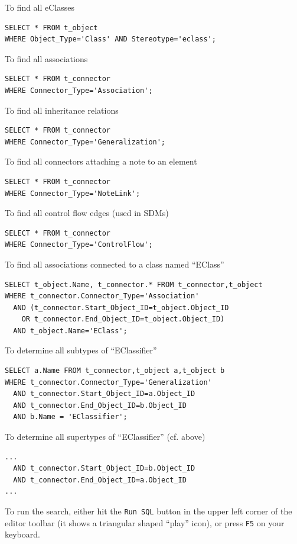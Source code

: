 \begin{stepbystep}

\item To find all eClasses
\begin{lstlisting}[linewidth=11cm]
SELECT * FROM t_object
WHERE Object_Type='Class' AND Stereotype='eclass';
\end{lstlisting}

\item To find all associations
\begin{lstlisting}[linewidth=11cm]
SELECT * FROM t_connector
WHERE Connector_Type='Association';
\end{lstlisting}

\item To find all inheritance relations
\begin{lstlisting}[linewidth=11cm]
SELECT * FROM t_connector
WHERE Connector_Type='Generalization';
\end{lstlisting}

\item To find all connectors attaching a note to an element
\begin{lstlisting}[linewidth=11cm]
SELECT * FROM t_connector
WHERE Connector_Type='NoteLink';
\end{lstlisting}

\item To find all control flow edges (used in SDMs)
\begin{lstlisting}[linewidth=11cm]
SELECT * FROM t_connector
WHERE Connector_Type='ControlFlow';
\end{lstlisting}

\item To find all associations connected to a class named ``EClass''
\begin{lstlisting}[linewidth=11cm]
SELECT t_object.Name, t_connector.* FROM t_connector,t_object
WHERE t_connector.Connector_Type='Association'
  AND (t_connector.Start_Object_ID=t_object.Object_ID
    OR t_connector.End_Object_ID=t_object.Object_ID)
  AND t_object.Name='EClass';
\end{lstlisting}

\item To determine all subtypes of ``EClassifier''
\begin{lstlisting}[linewidth=11cm]
SELECT a.Name FROM t_connector,t_object a,t_object b
WHERE t_connector.Connector_Type='Generalization'
  AND t_connector.Start_Object_ID=a.Object_ID
  AND t_connector.End_Object_ID=b.Object_ID
  AND b.Name = 'EClassifier';
\end{lstlisting}

\item To determine all supertypes of ``EClassifier'' (cf. above)
\begin{lstlisting}[linewidth=11cm]
...
  AND t_connector.Start_Object_ID=b.Object_ID
  AND t_connector.End_Object_ID=a.Object_ID
...
\end{lstlisting}

\end{stepbystep}

To run the search, either hit the \texttt{Run SQL} button in the upper left corner of the editor toolbar (it shows a triangular shaped ``play'' icon), or
press \texttt{F5} on your keyboard.

\clearpage
